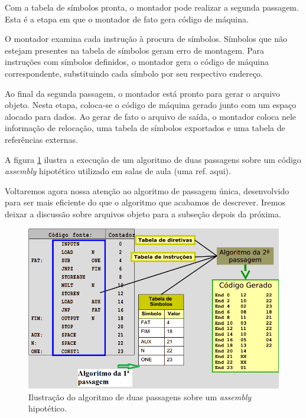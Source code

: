 Com a tabela de símbolos pronta, o montador pode realizar a segunda passagem. Esta é a etapa em que o montador de fato gera código de máquina. 

O montador examina cada instrução à procura de símbolos. Símbolos que não estejam presentes na tabela de símbolos geram erro de montagem. Para instruções com símbolos definidos, o montador gera o código de máquina correspondente, substituindo cada símbolo por seu respectivo endereço.

Ao final da segunda passagem, o montador está pronto para gerar o arquivo objeto. Nesta etapa, coloca-se o código de máquina gerado junto com um espaço alocado para dados. Ao gerar de fato o arquivo de saída, o montador coloca nele informação de relocação, uma tabela de símbolos exportados e uma tabela de referências externas.

A figura \ref{duas_passagens} ilustra a execução de um algoritmo de duas passagens sobre um código \textit{assembly} hipotético utilizado em salas de aula (uma ref. aqui).

Voltaremos agora nossa atenção ao algoritmo de passagem única, desenvolvido para ser mais eficiente do que o algoritmo que acabamos de descrever. Iremos deixar a discussão sobre arquivos objeto para a subseção depois da próxima.

\begin{figure}[ptb]
  \begin{center}
    \includegraphics[scale=.7]{imagens/duas_passagens}
  \end{center}
  \caption{Ilustração do algoritmo de duas passagens sobre um \textit{assembly} hipotético.}
  \label{duas_passagens}
\end{figure}

